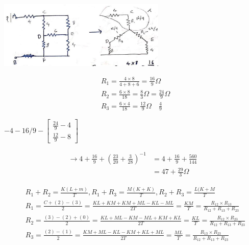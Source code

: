 \documentclass[12pt, a4paper]{article}
\newcommand{\figwidth}{8cm}
\begin{document}
\begin{center}
	\includegraphics[max width=\figwidth]{2024_06_15_f9b8f5fbbfa74e15de4eg-4(2)}
\end{center}

$$
	\begin{aligned}
		 & R_1=\frac{4 \times 8}{4+8+6}=\frac{16}{9} \Omega                 \\
		 & R_2=\frac{6 \times 8}{18}=\frac{8}{3} \Omega=\frac{24}{9} \Omega \\
		 & R_3=\frac{6 \times 4}{18}=\frac{12}{9} \Omega \quad \frac{4}{9}
	\end{aligned}
$$

$-4-16 / 9-\left[\begin{array}{c}\frac{24}{9}-4 \\ \frac{12}{9}-8\end{array}\right]$

$$
	\begin{aligned}
		\rightarrow 4+\frac{16}{9}+\left(\frac{23}{20}+\frac{3}{28}\right)^{-1} & =4+\frac{16}{9}+\frac{560}{144} \\
		                                                                        & =47+\frac{29}{3} \Omega
	\end{aligned}
$$

$$
	\begin{aligned}
		 & R_1+R_2=\frac{K(L+m)}{T}, R_1+R_3=\frac{M(K+K)}{T}, R_2+R_3=\frac{L(K+M}{T}                                                   \\
		 & R_1=\frac{C+(2)-(3)}{2}=\frac{K L+K M+K M+M L-K L-M L}{2 T}=\frac{K M}{T}=\frac{R_{12} \times R_{13}}{R_{12}+R_{13}+R_{23}}   \\
		 & R_2=\frac{(3)-(2)+(0)}{2}=\frac{K L+M L-K M-M L+K M+K L}{2 T}=\frac{K L}{T}=\frac{R_{12} \times R_{23}}{R_{12}+R_{13}+R_{23}} \\
		 & R_3=\frac{(2)-(1)}{2}=\frac{K M+M L-K L-K M+K L+M L}{2 T}=\frac{M L}{T}=\frac{R_{13} \times R_{23}}{R_{12}+R_{13}+R_{23}}
	\end{aligned}
$$
\end{document}
